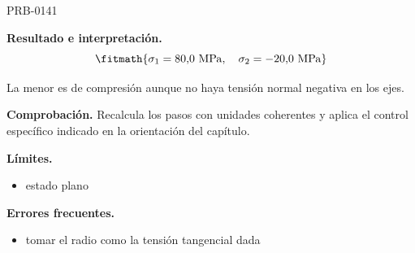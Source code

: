 \begin{studiumworked}{PRB-0141}
\begin{enumerate}
\end{enumerate}

\textbf{Resultado e interpretación.}\[\fitmath{\sigma_1 = 80{,}0\ \mathrm{MPa},\quad \sigma_2 = -20{,}0\ \mathrm{MPa}}\]

La menor es de compresión aunque no haya tensión normal negativa en los ejes.

\par\textbf{Comprobación.} Recalcula los pasos con unidades coherentes y aplica el control específico indicado en la orientación del capítulo.

\textbf{Límites.}\begin{itemize}\item estado plano\end{itemize}

\textbf{Errores frecuentes.}\begin{itemize}\item tomar el radio como la tensión tangencial dada\end{itemize}

\end{studiumworked}

\Needspace{.3\textheight}

